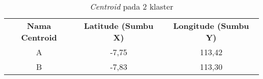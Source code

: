 \begin{table}[H]
\footnotesize
\centering
\begin{tabular}{ccc}
\rowcolor[HTML]{4472C4} 
{\color[HTML]{FFFFFF} \textbf{Nama   Centroid}} & {\color[HTML]{FFFFFF} \textbf{Latitude (Sumbu X)}} & {\color[HTML]{FFFFFF} \textbf{Longitude (Sumbu Y)}} \\
\rowcolor[HTML]{D9E1F2} 
A                                               & -7,75                                              & 113,42                                              \\
B                                               & -7,83                                              & 113,30                                             
\end{tabular}
\caption{\textit{Centroid} pada 2 klaster}
\label{tab:center2}
\end{table}